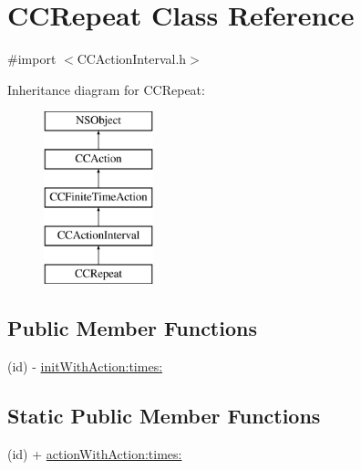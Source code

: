 \hypertarget{interface_c_c_repeat}{\section{C\-C\-Repeat Class Reference}
\label{interface_c_c_repeat}
}


{\ttfamily \#import $<$C\-C\-Action\-Interval.\-h$>$}

Inheritance diagram for C\-C\-Repeat\-:\begin{figure}[H]
\begin{center}
\leavevmode
\includegraphics[height=5.000000cm]{interface_c_c_repeat}
\end{center}
\end{figure}
\subsection*{Public Member Functions}
\begin{DoxyCompactItemize}
\item 
(id) -\/ \hyperlink{interface_c_c_repeat_abe760648e5a2df2ea37bd33eab92c212}{init\-With\-Action\-:times\-:}
\end{DoxyCompactItemize}
\subsection*{Static Public Member Functions}
\begin{DoxyCompactItemize}
\item 
(id) + \hyperlink{interface_c_c_repeat_aa58aaa91601ba528b7d3fbcfdbbbd2f6}{action\-With\-Action\-:times\-:}
\end{DoxyCompactItemize}
